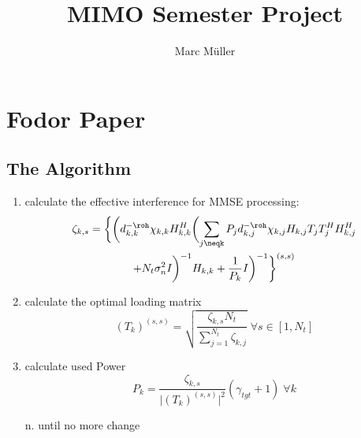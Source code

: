 \documentclass[9pt,draft]{report}
\begin{document}
\author{Marc Müller}
\title{MIMO Semester Project}

\chapter{Fodor Paper}
\section{The Algorithm}

\begin{enumerate}
	\item calculate the effective interference for MMSE processing:
		\begin{multline}
			\zeta_{k,s} = \biggl\{\biggl(d^{-\roh}_{k,k}\chi_{k,k}H^H_{k,k}\biggl(\sum_{j\neqk}{P_jd^{-\roh}_{k,j}\chi_{k,j}H_{k,j}T_jT_j^HH^H_{k,j}}\\
			+N_t\sigma^2_nI\biggr)^{-1}H_{k,k}+\frac{1}{P_k}I\biggr)^{-1}\biggr\}^{(s,s)}
		\end{multline}

	\item calculate the optimal loading matrix
		\begin{equation}
			(T_k)^{(s,s)} = \sqrt{\frac{\zeta_{k,s}N_t}{\sum_{j=1}^{N_t}\zeta_{k,j}}}\;\forall s\in[1,N_t]
		\end{equation}

	\item calculate used Power
		\begin{equation}
			P_k = \frac{\zeta_{k,s}}{\vert(T_k)^{(s,s)}\vert^2}(\gamma_{tgt}+1)\;\forall k
		\end{equation}

	\item[n.] until no more change

\end{enumerate}
\end{document}
